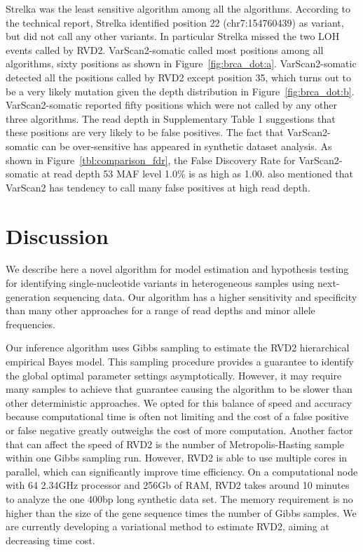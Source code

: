 \documentclass{bioinfo}
\begin{document}
Strelka was the least sensitive algorithm among all the algorithms. According to the technical report, Strelka identified position 22 (chr7:154760439) as variant, but did not call any other variants. In particular Strelka missed the two LOH events called by RVD2. VarScan2-somatic called most positions among all algorithms, sixty positions as shown in Figure~\ref{fig:brca_dot:a}. VarScan2-somatic  detected all the positions called by RVD2 except position 35, which turns out to be a very likely mutation given the depth distribution in Figure~\ref{fig:brca_dot:b}. VarScan2-somatic reported fifty positions which were not called by any other three algorithms. The read depth in Supplementary Table 1 suggestions that these positions are very likely to be false positives. The fact that VarScan2-somatic can be over-sensitive has appeared in synthetic dataset analysis. As shown in Figure~\ref{tbl:comparison_fdr}, the False Discovery Rate for VarScan2-somatic at read depth 53 MAF level 1.0\% is as high as 1.00.  \citet{spencer2013performance} also mentioned that VarScan2 has tendency to call many false positives at high read depth. 
\vspace{-5pt}
\section{Discussion}
We describe here a novel algorithm for model estimation and hypothesis testing for identifying single-nucleotide variants in heterogeneous samples using next-generation sequencing data. Our algorithm has a higher sensitivity and specificity than many other approaches for a range of read depths and minor allele frequencies.

Our inference algorithm uses Gibbs sampling to estimate the RVD2 hierarchical empirical Bayes model. This sampling procedure provides a guarantee to identify the global optimal parameter settings asymptotically. However, it may require many samples to achieve that guarantee causing the algorithm to be slower than other deterministic approaches. We opted for this balance of speed and accuracy because computational time is often not limiting and the cost of a false positive or false negative greatly outweighs the cost of more computation. Another factor that can affect the speed of RVD2 is the number of Metropolis-Hasting sample within one Gibbs sampling run. However, RVD2 is able to use multiple cores in parallel, which can significantly improve time efficiency. On a computational node with 64 2.34GHz processor and 256Gb of RAM, RVD2 takes around 10 minutes to analyze the one 400bp long synthetic data set. The memory requirement is no higher than the size of the gene sequence times the number of Gibbs samples. We are currently developing a variational method to estimate RVD2, aiming at decreasing time cost. 
\end{document}
